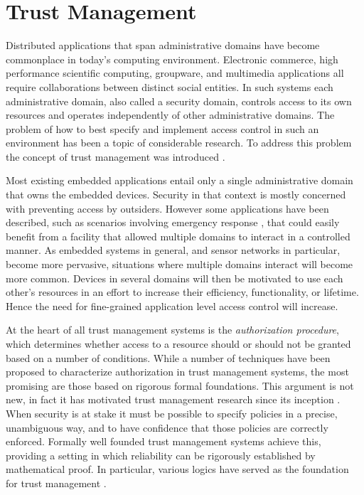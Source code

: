 
\chapter{Trust Management}
\label{chapter-trust-management}

Distributed applications that span administrative domains have become commonplace in today's
computing environment. Electronic commerce, high performance scientific computing, groupware,
and multimedia applications all require collaborations between distinct social entities. In such
systems each administrative domain, also called a security domain, controls access to its own
resources and operates independently of other administrative domains. The problem of how to best
specify and implement access control in such an environment has been a topic of considerable
research. To address this problem the concept of trust management was introduced \cite{Blaze:DTM}.

Most existing embedded applications entail only a single administrative domain that owns the
embedded devices. Security in that context is mostly concerned with preventing access by
outsiders. However some applications have been described, such as scenarios involving emergency
response \cite{1038146}, that could easily benefit from a facility that allowed multiple domains
to interact in a controlled manner. As embedded systems in general, and sensor networks in
particular, become more pervasive, situations where multiple domains interact will become more
common. Devices in several domains will then be motivated to use each other's resources in an
effort to increase their efficiency, functionality, or lifetime. Hence the need for fine-grained
application level access control will increase.

At the heart of all trust management systems is the \emph{authorization procedure}, which
determines whether access to a resource should or should not be granted based on a number of
conditions. While a number of techniques have been proposed to characterize authorization in
trust management systems, the most promising are those based on rigorous formal
foundations. This argument is not new, in fact it has motivated trust management research since
its inception \cite{woo93authorizations}. When security is at stake it must be possible to
specify policies in a precise, unambiguous way, and to have confidence that those policies are
correctly enforced. Formally well founded trust management systems achieve this, providing a
setting in which reliability can be rigorously established by mathematical proof. In particular,
various logics have served as the foundation for trust management
\cite{Abadi:LAC,Bertino:LFRAACM}.

